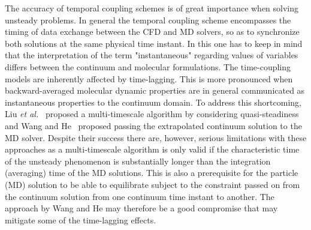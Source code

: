 \documentclass[preprint,12pt]{elsarticle}
\begin{document}
The accuracy of temporal coupling schemes is of great importance when solving unsteady problems. In general the temporal coupling scheme encompasses the timing of data exchange between the CFD and MD solvers, so as to synchronize both solutions at the same physical time instant. In this one has to keep in mind that the interpretation of the term "instantaneous" regarding values of variables differs between the continuum and molecular formulations. The time-coupling models are inherently affected by time-lagging. This is more pronounced when backward-averaged molecular dynamic properties are in general communicated as instantaneous properties to the continuum domain. To address this shortcoming, Liu {\it{et al.}}~\cite{Liu} proposed a multi-timescale algorithm by considering quasi-steadiness and Wang and He~\cite{Wang} proposed passing the extrapolated continuum solution to the MD solver. Despite their success there are, however, serious limitations with these approaches as a multi-timescale algorithm is only valid if the characteristic time of the unsteady phenomenon is substantially longer than the integration (averaging) time of the MD solutions. This is also a prerequisite for the particle (MD) solution to be able to equilibrate subject to the constraint passed on from the continuum solution from one continuum time instant to another. The approach by Wang and He may therefore be a good compromise that may mitigate some of the time-lagging effects.
\end{document}

